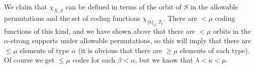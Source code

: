 \documentclass[112pt]{article}
\begin{document}
\begin{description}
\begin{comment}
We need to verify the claim that there are $<\mu$ coding functions $\chi_{\{b\}_\alpha,T_b}$ in play.  It is given that $T_b$ is computed from
$S_b$, but what we actually need is something like the specification of $T_b$ being computable from the specification of $S_b$.  There are $\mu_0<\mu$ specifications for supports $S_b$ available at the current stage by the inductive hypothesis [more generally there is $\mu_0<\mu$ dominating the number of coding functions in any type below $\alpha$, since there are $<\kappa$ such types].   Any specification built the way we describe uses
an $S_b$ to start, which has one of $\mu_0$ possible specifications.  Each further refinement involves choosing an $S_d$ (with one of $\mu_0$ possible specifications) to insert 
at stated positions (or the specification of an atom and a litter in the $\delta=-1$ case).  The exact information needed is for each element of $S_d$ where it is to be inserted in the preceding specification (or where it is already present):  there are no more than $2^\kappa\leq \mu_0<\mu$ ways to make such an insertion, so $\mu_0$ ways to make an insertion of an $S_d$ in a stated way. There will be $<\kappa$ such insertions.
There are $<\mu$ possible descriptions of such processes of insertion (this involves appealing both to the fact that $\mu$ is strong limit and the fact that its cofinality is at least $\kappa$), including descriptions of actually ill-founded processes (of course, an actual construction of a $T_b$ will be well-founded).  So there are $<\mu$ possible specifications for supports $T_b$ constructed as above.   So we have a family of $<\mu$ coding functions of the kind indicated whose ranges cover the singletons $\{b\}_\alpha$:  if $T_b$ and $T_{b'}$ have the same specification then there is an $\alpha$-allowable permutation whose action sends $T_b$ to $T_{b'}$ so $b$ to $b'$ so $\chi_{\{b\}_\alpha,T_b}$ and $\chi_{\{b'\}_\alpha,T_{b'}}$ are the same coding function.

\end{comment}

We claim that $\chi_{X,S}$ can be defined in terms of the orbit of $S$ in the allowable permutations and the set of coding functions $\chi_{\{b\}_\alpha,T_b}$.  There are $<\mu$ coding functions of this kind, and we have shown above that there are $<\mu$ orbits in the $\alpha$-strong supports under allowable permutations, so this will imply that there are $\leq \mu$ elements of type $\alpha$ (it is obvious that there are $\geq \mu$ elements of each type).
Of course we get $\leq \mu$ codes for each $\beta<\alpha$, but we know that $\lambda<\kappa<\mu$.


\end{description}
\end{document}
